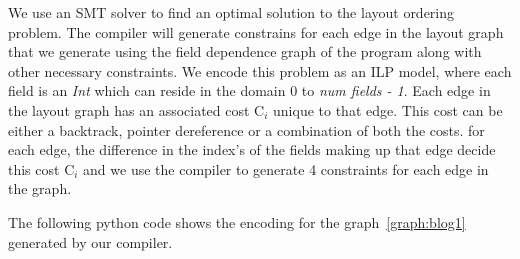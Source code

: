 We use an SMT solver to find an optimal solution to the layout ordering problem.
The compiler will generate constrains for each edge in the layout graph that we generate using the field dependence graph of the program along with 
other necessary constraints.
We encode this problem as an ILP model, where each field is an \textit{Int} which can reside in the domain 0 to \textit{num fields - 1}.
Each edge in the layout graph has an associated cost C$_i$ unique to that edge. 
This cost can be either a backtrack, pointer dereference or a combination of both the costs. 
for each edge, the difference in the index's of the fields making up that edge decide this cost C$_i$ and we use the compiler to generate 4 constraints for each edge in the graph. 

The following python code shows the encoding for the graph~\ref{graph:blog1} generated by our compiler.














